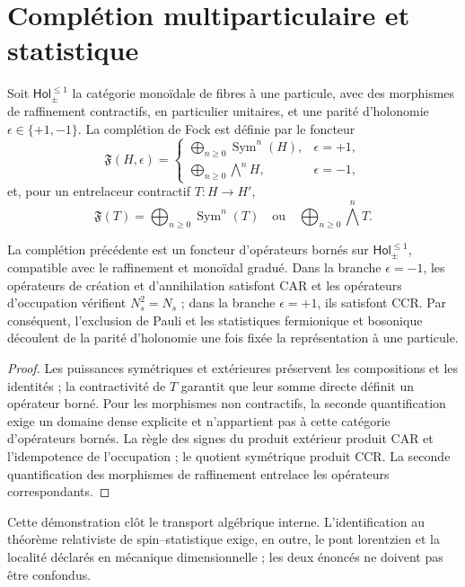 \section{Complétion multiparticulaire et statistique}

Soit \(\mathsf{Hol}_{\pm}^{\leq1}\) la catégorie monoïdale de fibres à une
particule, avec des morphismes de raffinement contractifs, en particulier unitaires,
et une parité d'holonomie
\(\epsilon\in\{+1,-1\}\). La complétion de Fock est définie par le foncteur
\[
 \mathfrak F(H,\epsilon)=
 \begin{cases}
 \displaystyle\bigoplus_{n\ge0}\operatorname{Sym}^n(H),
     &\epsilon=+1,\\[2mm]
 \displaystyle\bigoplus_{n\ge0}\bigwedge^n\!H,
     &\epsilon=-1,
 \end{cases}
\]
et, pour un entrelaceur contractif \(T:H\to H'\),
\[
 \mathfrak F(T)=
 \bigoplus_{n\ge0}\operatorname{Sym}^n(T)
 \quad\text{ou}\quad
 \bigoplus_{n\ge0}\bigwedge^n\!T.
\]

\begin{theorem}
La complétion précédente est un foncteur d'opérateurs bornés sur
\(\mathsf{Hol}_{\pm}^{\leq1}\), compatible avec le raffinement et
monoïdal gradué. Dans la branche \(\epsilon=-1\), les opérateurs de création et
d'annihilation satisfont CAR et les opérateurs d'occupation vérifient
\(N_s^2=N_s\) ; dans la branche \(\epsilon=+1\), ils satisfont CCR. Par conséquent,
l'exclusion de Pauli et les statistiques fermionique et bosonique découlent de la
parité d'holonomie une fois fixée la représentation à une particule.
\end{theorem}

\begin{proof}
Les puissances symétriques et extérieures préservent les compositions et les identités ;
la contractivité de \(T\) garantit que leur somme directe définit un opérateur
borné. Pour les morphismes non contractifs, la seconde quantification exige un
domaine dense explicite et n'appartient pas à cette catégorie d'opérateurs bornés.
La règle des signes du produit extérieur produit CAR et l'idempotence de
l'occupation ; le quotient symétrique produit CCR. La seconde quantification des
morphismes de raffinement entrelace les opérateurs correspondants.
\end{proof}

Cette démonstration clôt le transport algébrique interne. L'identification
au théorème relativiste de spin--statistique exige, en outre, le pont
lorentzien et la localité déclarés en mécanique dimensionnelle ; les deux énoncés
ne doivent pas être confondus.

